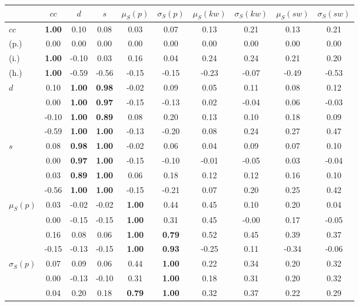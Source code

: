 \begin{table*}[h!]
\begin{center}
\begin{tabular}{| l || c | c | c | c | c | c | c | c | c |}\hline
 & $cc$ & $d$ & $s$ & $\mu_S(p)$ & $\sigma_S(p)$ & $\mu_S(kw)$ & $\sigma_S(kw)$ & $\mu_S(sw)$ & $\sigma_S(sw)$ \\\hline\hline
$cc$ & {\bf 1.00} & 0.10 & 0.08 & 0.03 & 0.07 & 0.13 & 0.21 & 0.13 & 0.21 \\
(p.) & 0.00  & 0.00  & 0.00  & 0.00  & 0.00  & 0.00  & 0.00  & 0.00  & 0.00 \\
(i.) & {\bf 1.00} & -0.10 & 0.03 & 0.16 & 0.04 & 0.24 & 0.24 & 0.21 & 0.20 \\
(h.) & {\bf 1.00} & -0.59 & -0.56 & -0.15 & -0.15 & -0.23 & -0.07 & -0.49 & -0.53 \\\hline
$d$ & 0.10 & {\bf 1.00} & {\bf 0.98} & -0.02 & 0.09 & 0.05 & 0.11 & 0.08 & 0.12 \\
 & 0.00 & {\bf 1.00} & {\bf 0.97} & -0.15 & -0.13 & 0.02 & -0.04 & 0.06 & -0.03 \\
 & -0.10 & {\bf 1.00} & {\bf 0.89} & 0.08 & 0.20 & 0.13 & 0.10 & 0.18 & 0.09 \\
 & -0.59 & {\bf 1.00} & {\bf 1.00} & -0.13 & -0.20 & 0.08 & 0.24 & 0.27 & 0.47 \\\hline
$s$ & 0.08 & {\bf 0.98} & {\bf 1.00} & -0.02 & 0.06 & 0.04 & 0.09 & 0.07 & 0.10 \\
 & 0.00 & {\bf 0.97} & {\bf 1.00} & -0.15 & -0.10 & -0.01 & -0.05 & 0.03 & -0.04 \\
 & 0.03 & {\bf 0.89} & {\bf 1.00} & 0.06 & 0.18 & 0.12 & 0.12 & 0.16 & 0.10 \\
 & -0.56 & {\bf 1.00} & {\bf 1.00} & -0.15 & -0.21 & 0.07 & 0.20 & 0.25 & 0.42 \\\hline
$\mu_S(p)$ & 0.03 & -0.02 & -0.02 & {\bf 1.00} & 0.44 & 0.45 & 0.10 & 0.20 & 0.04 \\
 & 0.00 & -0.15 & -0.15 & {\bf 1.00} & 0.31 & 0.45 & -0.00 & 0.17 & -0.05 \\
 & 0.16 & 0.08 & 0.06 & {\bf 1.00} & {\bf 0.79} & 0.52 & 0.45 & 0.39 & 0.37 \\
 & -0.15 & -0.13 & -0.15 & {\bf 1.00} & {\bf 0.93} & -0.25 & 0.11 & -0.34 & -0.06 \\\hline
$\sigma_S(p)$ & 0.07 & 0.09 & 0.06 & 0.44 & {\bf 1.00} & 0.22 & 0.34 & 0.20 & 0.32 \\
 & 0.00 & -0.13 & -0.10 & 0.31 & {\bf 1.00} & 0.18 & 0.31 & 0.20 & 0.32 \\
 & 0.04 & 0.20 & 0.18 & {\bf 0.79} & {\bf 1.00} & 0.32 & 0.37 & 0.22 & 0.29 \\

\end{tabular}
\end{center}
\end{table*}
